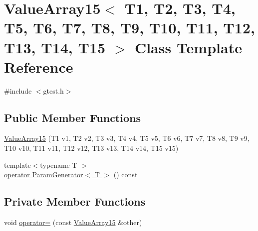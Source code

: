 \hypertarget{classtesting_1_1internal_1_1ValueArray15}{\section{\-Value\-Array15$<$ \-T1, \-T2, \-T3, \-T4, \-T5, \-T6, \-T7, \-T8, \-T9, \-T10, \-T11, \-T12, \-T13, \-T14, \-T15 $>$ \-Class \-Template \-Reference}
\label{da/d4b/classtesting_1_1internal_1_1ValueArray15}
}


{\ttfamily \#include $<$gtest.\-h$>$}

\subsection*{\-Public \-Member \-Functions}
\begin{DoxyCompactItemize}
\item 
\hyperlink{classtesting_1_1internal_1_1ValueArray15_a19388f86380e74e98f0309f76e090099}{\-Value\-Array15} (\-T1 v1, \-T2 v2, \-T3 v3, \-T4 v4, \-T5 v5, \-T6 v6, \-T7 v7, \-T8 v8, \-T9 v9, \-T10 v10, \-T11 v11, \-T12 v12, \-T13 v13, \-T14 v14, \-T15 v15)
\item 
{\footnotesize template$<$typename T $>$ }\\\hyperlink{classtesting_1_1internal_1_1ValueArray15_a08ef46fa12c9dd8ef6fc630baeea89b7}{operator Param\-Generator$<$ T $>$} () const 
\end{DoxyCompactItemize}
\subsection*{\-Private \-Member \-Functions}
\begin{DoxyCompactItemize}
\item 
void \hyperlink{classtesting_1_1internal_1_1ValueArray15_a1f0291912db469b050bff2c402674aad}{operator=} (const \hyperlink{classtesting_1_1internal_1_1ValueArray15}{\-Value\-Array15} \&other)
\end{DoxyCompactItemize}
